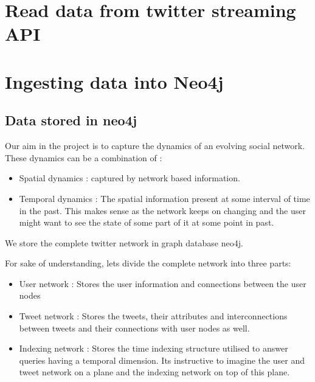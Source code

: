 \documentclass[letterpaper,10pt,english]{sphinxmanual}
\begin{document}
\chapter{Read data from twitter streaming API}
\label{\detokenize{twitter_stream:read-data-from-twitter-streaming-api}}\label{\detokenize{twitter_stream::doc}}

\chapter{Ingesting data into Neo4j}
\label{\detokenize{neo4j_data_ingestion:ingesting-data-into-neo4j}}\label{\detokenize{neo4j_data_ingestion::doc}}

\section{Data stored in neo4j}
\label{\detokenize{neo4j_data_ingestion:data-stored-in-neo4j}}
Our aim in the project is to capture the dynamics of an evolving social network. These dynamics can be a combination of :
\begin{itemize}
\item {} 
Spatial dynamics : captured by network based information.

\item {} 
Temporal dynamics : The spatial information present at some interval of time in the past. This makes sense as the network keeps on changing and the user might want to see the state of some part of it at some point in past.

\end{itemize}

We store the complete twitter network in graph database neo4j.

For sake of understanding, lets divide the complete network into three parts:
\begin{itemize}
\item {} 
User network : Stores the user information and connections between the user nodes

\item {} 
Tweet network : Stores the tweets, their attributes and interconnections between tweets and their connections with user nodes as well.

\item {} 
Indexing network : Stores the time indexing structure utilised to answer queries having a temporal dimension. Its instructive to imagine the user and tweet network on a plane and the indexing network on top of this plane.

\end{itemize}
\end{document}
